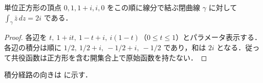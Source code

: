 \begin{example}[閉曲線に沿う共役函数の積分]
単位正方形の頂点 $0,1,1+i,i,0$ をこの順に線分で結ぶ閉曲線 $\gamma$ に対して $\int_\gamma\bar z\,dz=2i$ である．
\end{example}
\begin{proof}
各辺を $t,\ 1+it,\ 1-t+i,\ i(1-t)$（$0\leq t\leq1$）とパラメータ表示する．各辺の積分は順に $1/2,\ 1/2+i,\ -1/2+i,\ -1/2$ であり，和は $2i$ となる．従って共役函数は正方形を含む開集合上で原始函数を持たない．
\end{proof}
積分経路の向きは  に示す．
